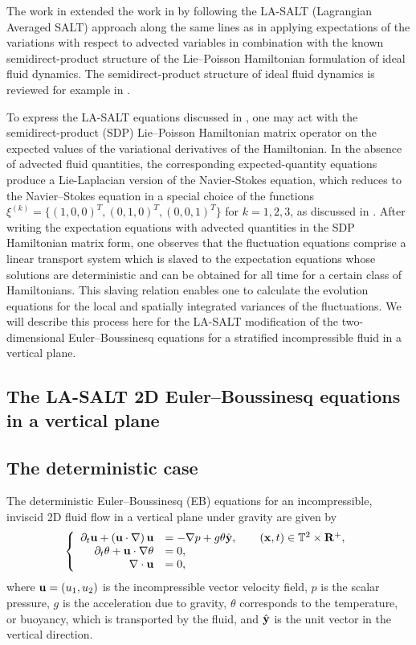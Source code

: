 \documentclass[11pt, oneside]{article}   	%
\numberwithin{equation}{section}
\theoremstyle{plain}
\theoremstyle{definition}
\theoremstyle{remark}
\newcommand{\<}{\langle}
\renewcommand{\>}{\rangle}
\def\RR{{\bf R}}
\def\u{{\bf{u}}}
\def\x{{\bf{x}}}
\def\y{{\bf{y}}}
\begin{document}
The work in \cite{DieAytJNLS} extended the work in \cite{DrivasHolm2019} by following the LA-SALT (Lagrangian Averaged SALT) approach along the same lines as \cite{DrivasHolmLeahy2020} in applying expectations of the variations with respect to advected variables in combination with the known semidirect-product structure of the Lie--Poisson Hamiltonian formulation of ideal fluid dynamics. The semidirect-product structure of ideal fluid dynamics is reviewed for example in \cite{MR2013, HSS2009}. 

To express the LA-SALT equations discussed in \cite{DrivasHolmLeahy2020}, one may act with the semidirect-product (SDP) Lie--Poisson Hamiltonian matrix operator on the expected values of the variational derivatives of the Hamiltonian. In the absence of advected fluid quantities, the corresponding expected-quantity equations produce a Lie-Laplacian version of the Navier-Stokes equation, which reduces to the Navier--Stokes equation in a special choice of the functions $ \xi^{(k)}=\{(1,0,0)^T,(0,1,0)^T,(0,0,1)^T\}$ for $k=1,2,3$, as discussed in \cite{Hoch2018}. After writing the expectation equations with advected quantities in the SDP Hamiltonian matrix form, one observes that the fluctuation equations comprise a linear transport system which is slaved to the expectation equations whose solutions are deterministic and can be obtained for all time for a certain class of Hamiltonians. This slaving relation enables one to calculate the evolution equations for the local and spatially integrated variances of the fluctuations. We will describe this process here for the LA-SALT modification of the two-dimensional Euler--Boussinesq equations for a stratified incompressible fluid in a vertical plane.



\bigskip

\subsection{The LA-SALT 2D Euler--Boussinesq equations in a vertical plane}
\subsection*{The deterministic case}
The deterministic Euler--Boussinesq (EB) equations for an incompressible, inviscid 2D fluid flow in a vertical plane under gravity are given by
\begin{equation}\label{Inviscid_Boussinesq}
\left\{
\begin{array}{rl}
\partial_t\u+\left(\u\cdot\nabla\right)\u &=-\nabla p+ g\theta \hat{\y}, \qquad (\x,t)\in \mathbb{T}^2\times\RR^{+},\\
\partial_t\theta +\u\cdot\nabla \theta &= 0, \\
\nabla\cdot\u&=0,
\end{array}
\right.
\end{equation}
where $\u=(u_{1},u_{2})$ is the incompressible vector velocity field, $p$ is the scalar pressure, $g$ is the acceleration due to gravity, $\theta$  corresponds to the temperature, or buoyancy, which is transported by the fluid, and $\hat{\y}$ is the unit vector in the vertical direction. 
\end{document}
